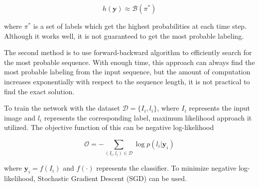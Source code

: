 \begin{equation}
    h(\mathbf{y})\approx\mathcal{B}(\pi^*)
\end{equation}

where $\pi^{*}$ is a set of labels which get the highest probabilities at each time step.
Although it works well, it is not guaranteed to get the most probable labeling.

The second method is to use forward-backward algorithm to efficiently search for the most
probable sequence. With enough time, this approach can always find the most probable labeling
from the input sequence, but the amount of computation increases exponentially with respect to
the sequence length, it is not practical to find the exact solution.

To train the network with the dataset $\mathcal{D} = \{I_i, l_i\}$, where $I_i$ represents
the input image and $l_i$ represents the corresponding label, maximum likelihood approach
it utilized. The objective function of this can be negative log-likelihood

\begin{equation}
    \mathcal{O} = -\sum_{(I_i, l_i)\in\mathcal{D}} \log p(l_i|\mathbf{y}_i)
\end{equation}

where $\mathbf{y}_i = f(I_i)$ and $f(\cdot)$ represents the classifier. To minimize negative
log-likelihood, Stochastic Gradient Descent (SGD) can be used.
